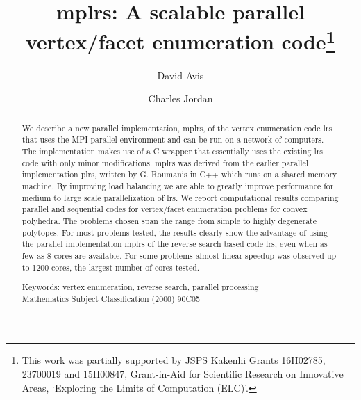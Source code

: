 \documentclass[a4paper,11pt]{article}   \usepackage{authblk} \usepackage[top=1.9cm,bottom=1.9cm,left=1.9cm,right=1.9cm]{geometry}
\newcommand{\progname}{\textsf}
\newcommand{\lrs}{\progname{lrs}\xspace}
\newcommand{\plrs}{\progname{plrs}\xspace}
\newcommand{\mplrs}{\progname{mplrs}\xspace}
\begin{document}
\title{\mplrs: A scalable parallel vertex/facet enumeration code\thanks{This work was partially supported by JSPS 
Kakenhi Grants 16H02785, 23700019 and 15H00847, Grant-in-Aid for Scientific Research 
on Innovative Areas, `Exploring the Limits of Computation (ELC)'.}}

\author[1]{David Avis}
\author[2]{Charles Jordan}

\maketitle

\begin{abstract}
We describe a new parallel implementation, \mplrs, of the vertex enumeration code \lrs that 
uses the MPI parallel environment and can be run on a network of computers. 
The implementation makes use of a C wrapper that essentially uses the existing \lrs code
with only minor modifications. \mplrs was derived from the earlier parallel implementation \plrs,
written by G. Roumanis in C++ which runs on a shared memory machine.
By improving load balancing we are able to greatly improve performance for medium to large
scale parallelization of \lrs.
We report computational results comparing parallel and sequential codes for vertex/facet enumeration problems for convex polyhedra. 
The problems chosen span the range from simple to highly degenerate polytopes. 
For most problems tested, the results clearly show the advantage of using the parallel 
implementation \mplrs of the reverse search based code \lrs, even when as few as 8 cores are available. 
For some problems almost linear speedup was observed up to 1200 cores, the largest number of cores tested.

\noindent{}Keywords: vertex enumeration, reverse search, parallel processing\\
Mathematics Subject Classification (2000) 90C05
\end{abstract}
\end{document}
